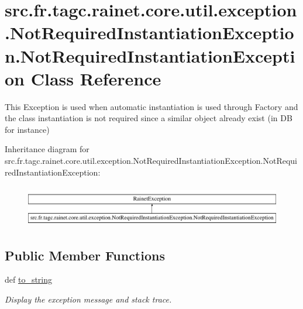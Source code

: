 \hypertarget{classsrc_1_1fr_1_1tagc_1_1rainet_1_1core_1_1util_1_1exception_1_1NotRequiredInstantiationExceptif1c629be8ad6f3196537937ab51f20ef}{\section{src.\-fr.\-tagc.\-rainet.\-core.\-util.\-exception.\-Not\-Required\-Instantiation\-Exception.\-Not\-Required\-Instantiation\-Exception Class Reference}
\label{classsrc_1_1fr_1_1tagc_1_1rainet_1_1core_1_1util_1_1exception_1_1NotRequiredInstantiationExceptif1c629be8ad6f3196537937ab51f20ef}
}


This Exception is used when automatic instantiation is used through Factory and the class instantiation is not required since a similar object already exist (in D\-B for instance)  


Inheritance diagram for src.\-fr.\-tagc.\-rainet.\-core.\-util.\-exception.\-Not\-Required\-Instantiation\-Exception.\-Not\-Required\-Instantiation\-Exception\-:\begin{figure}[H]
\begin{center}
\leavevmode
\includegraphics[height=1.833061cm]{classsrc_1_1fr_1_1tagc_1_1rainet_1_1core_1_1util_1_1exception_1_1NotRequiredInstantiationExceptif1c629be8ad6f3196537937ab51f20ef}
\end{center}
\end{figure}
\subsection*{Public Member Functions}
\begin{DoxyCompactItemize}
\item 
\hypertarget{classsrc_1_1fr_1_1tagc_1_1rainet_1_1core_1_1util_1_1exception_1_1NotRequiredInstantiationExceptif1c629be8ad6f3196537937ab51f20ef_a84ba16b50af74c8f9cf46b1e8ff1fbc4}{def \hyperlink{classsrc_1_1fr_1_1tagc_1_1rainet_1_1core_1_1util_1_1exception_1_1NotRequiredInstantiationExceptif1c629be8ad6f3196537937ab51f20ef_a84ba16b50af74c8f9cf46b1e8ff1fbc4}{to\-\_\-string}}\label{classsrc_1_1fr_1_1tagc_1_1rainet_1_1core_1_1util_1_1exception_1_1NotRequiredInstantiationExceptif1c629be8ad6f3196537937ab51f20ef_a84ba16b50af74c8f9cf46b1e8ff1fbc4}

\begin{DoxyCompactList}\small\item\em Display the exception message and stack trace. \end{DoxyCompactList}\end{DoxyCompactItemize}


